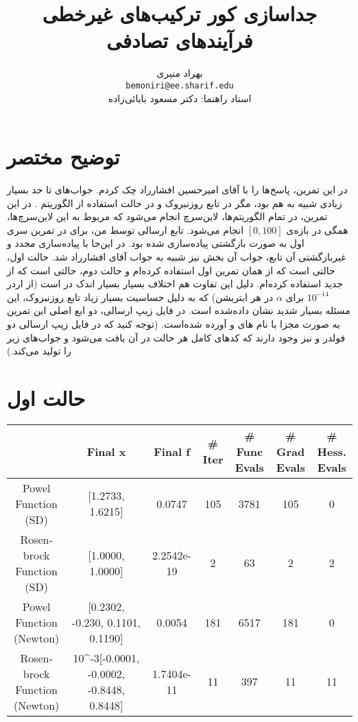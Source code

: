 \documentclass{article}
\title{جداسازی کور ترکیب‌های غیرخطی فرآیند‌های تصادفی}
\author{
	بهراد منیری\\
	\texttt{bemoniri@ee.sharif.edu}
	\vspace{0.5cm}\\
	استاد راهنما:
	دکتر مسعود بابائی‌زاده
}
\date{}
\begin{document}
\begin{landscape}
\section{توضیح مختصر}
در این تمرین، پاسخ‌ها را با آقای امیرحسین افشارراد چک کردم. جواب‌های تا حد بسیار زیادی شبیه‌ به هم بود، مگر در تابع روزنبروک و در حالت استفاده از الگوریتم 
.
در این تمرین، در تمام الگوریتم‌ها، لاین‌سرچ انجام می‌شود که 
مربوط به این لاین‌سرچ‌ها، همگی در بازه‌ی 
$[0, 100]$
انجام می‌شود. تابع ارسالی توسط من، برای 
در تمرین سری اول به صورت بازگشتی پیاده‌سازی شده بود. در این‌جا با پیاده‌سازی مجدد و غیربازگشتی آن تابع، جواب آن بخش نیز شبیه به جواب آقای افشارراد شد. حالت اول، حالتی است که از همان  
تمرین اول استفاده کرده‌ام و حالت دوم، حالتی است که از 
جدید استفاده کرده‌ام. دلیل این تفاوت هم اختلاف بسیار بسیار اندک در 
است (از اردر 
$10^{-14}$
برای $\alpha$ در هر ایتریشن) که به دلیل حساسیت بسیار زیاد تابع روزنبروک، این مسئله بسیار شدید نشان داده‌شده است. در فایل زیپ‌ ارسالی، دو ابع اصلی این تمرین به صورت مجزا با نام های
و 
آورده شده‌است.
(توجه کنید که در فایل زیپ ارسالی دو فولدر 
و
نیز وجود دارند که کد‌های کامل هر حالت در آن یافت می‌شود و جواب‌های زیر را تولید می‌کند.)

\section{حالت اول}
\begin{latin}
\begin{table}[h!]
	\begin{tabular}{|c|c|c|c|c|c|c|}
		\hline
		& \textbf{Final x}                                              & Final f    & \# Iter & \# Func Evals & \# Grad Evals & \# Hess. Evals \\ \hline
		Powel Function  (SD)         & {[}1.2733, 1.6215{]}                                          & 0.0747     & 105     & 3781          & 105           & 0              \\ \hline
		Rosenbrock Function (SD)     & {[}1.0000, 1.0000{]}                                          & 2.2542e-19 & 2       & 63            & 2             & 2              \\ \hline
		Powel Function (Newton)      & {[}0.2302, -0.230, 0.1101, 0.1190{]}                          & 0.0054     & 181     & 6517          & 181           & 0              \\ \hline
		Rosenbrock Function (Newton) & 10\textasciicircum{}-3{[}-0.0001, -0.0002, -0.8448, 0.8448{]} & 1.7404e-11 & 11      & 397           & 11            & 11             \\ \hline
	\end{tabular}
\end{table}
\end{latin}


\end{landscape}
\end{document}
